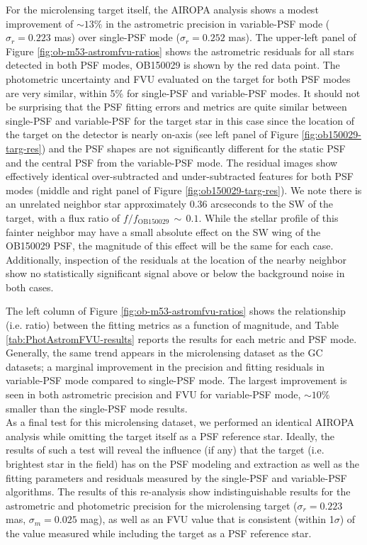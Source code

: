 \documentclass[]{spie}  %
\begin{document}
\indent For the microlensing target itself, the AIROPA analysis shows a modest improvement of ${\sim}13\%$ in the astrometric precision in variable-PSF mode ($\sigma_{r}=0.223$ mas) over single-PSF mode ($\sigma_{r}=0.252$ mas). The upper-left panel of Figure \ref{fig:ob-m53-astromfvu-ratios} shows the astrometric residuals for all stars detected in both PSF modes, OB150029 is shown by the red data point. The photometric uncertainty and FVU evaluated on the target for both PSF modes are very similar, within 5\% for single-PSF and variable-PSF modes. It should not be surprising that the PSF fitting errors and metrics are quite similar between single-PSF and variable-PSF for the target star in this case since the location of the target on the detector is nearly on-axis (see left panel of Figure \ref{fig:ob150029-targ-res}) and the PSF shapes are not significantly different for the static PSF and the central PSF from the variable-PSF mode. The residual images show effectively identical over-subtracted and under-subtracted features for both PSF modes (middle and right panel of Figure \ref{fig:ob150029-targ-res}). We note there is an unrelated neighbor star approximately 0.36 arcseconds to the SW of the target, with a flux ratio of $f/f_{\textrm{OB150029}}\, {\sim}\, 0.1$. While the stellar profile of this fainter neighbor may have a small absolute effect on the SW wing of the OB150029 PSF, the magnitude of this effect will be the same for each case. Additionally, inspection of the residuals at the location of the nearby neighbor show no statistically significant signal above or below the background noise in both cases.

\indent The left column of Figure \ref{fig:ob-m53-astromfvu-ratios} shows the relationship (i.e. ratio) between the fitting metrics as a function of magnitude, and Table \ref{tab:PhotAstromFVU-results} reports the results for each metric and PSF mode. Generally, the same trend appears in the microlensing dataset as the GC datasets; a marginal improvement in the precision and fitting residuals in variable-PSF mode compared to single-PSF mode. The largest improvement is seen in both astrometric precision and FVU for variable-PSF mode, ${\sim} 10\%$ smaller than the single-PSF mode results.
\\
\indent As a final test for this microlensing dataset, we performed an identical AIROPA analysis while omitting the target itself as a PSF reference star. Ideally, the results of such a test will reveal the influence (if any) that the target (i.e. brightest star in the field) has on the PSF modeling and extraction as well as the fitting parameters and residuals measured by the single-PSF and variable-PSF algorithms. The results of this re-analysis show indistinguishable results for the astrometric and photometric precision for the microlensing target ($\sigma_{r}=0.223$ mas, $\sigma_{m}=0.025$ mag), as well as an FVU value that is consistent (within 1$\sigma$) of the value measured while including the target as a PSF reference star.
\end{document}
